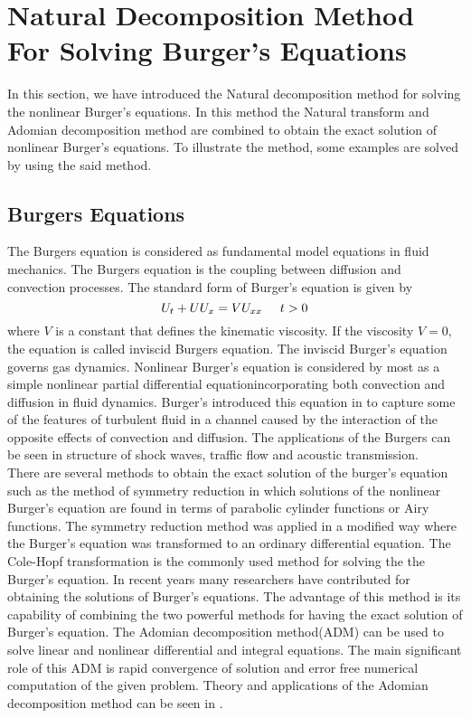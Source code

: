 \section{Natural Decomposition Method For Solving Burger's Equations}
 In this section, we have introduced the Natural decomposition method for solving the nonlinear Burger's equations. In this method the Natural transform and Adomian decomposition method are combined to obtain the exact solution of nonlinear Burger's equations. To illustrate the method, some examples are solved by using the said method.
\subsection{Burgers Equations}
The Burgers equation\cite{R22} is considered as fundamental model equations in fluid mechanics. The Burgers equation is the coupling between diffusion and convection processes. The standard form of Burger's equation is given by
\begin{equation}
U_{t}+UU_{x}=VU_{xx}  \hspace{0.5 cm} t>0
\end{equation}
where $V$ is a constant that defines the kinematic viscosity. If the viscosity $V=0$, the equation is called inviscid Burgers equation. The inviscid Burger's equation governs gas dynamics. Nonlinear Burger's equation is considered by most as a simple nonlinear partial differential equation\cite{R93}incorporating both convection and diffusion in fluid dynamics. Burger's introduced this equation in \cite{R22} to capture some of the features of turbulent fluid in a channel caused by the interaction of the opposite effects of convection and diffusion. The applications of the Burgers can be seen in structure of shock waves, traffic flow and acoustic transmission.\\
There are several methods to obtain the exact solution of the burger's equation such as the method of symmetry reduction in which solutions of the nonlinear Burger's equation are found in terms of parabolic cylinder functions or Airy functions. The symmetry reduction method was applied in a modified way where the Burger's equation was transformed to an ordinary differential equation. The Cole-Hopf transformation is the commonly used method for solving the the Burger's equation. In recent years many researchers have contributed for obtaining the solutions of Burger's equations\cite{R8,R65,R83,R86}. The advantage of this method is its capability of combining the two powerful methods for having the exact solution of Burger's equation. The Adomian decomposition method(ADM) can be used to solve linear and nonlinear differential and integral equations. The main significant role of this ADM is rapid convergence of solution and error free numerical computation of the given problem. Theory and applications of the Adomian decomposition method can be seen in \cite{R1,R2,R26,R27,R28,R93}.
